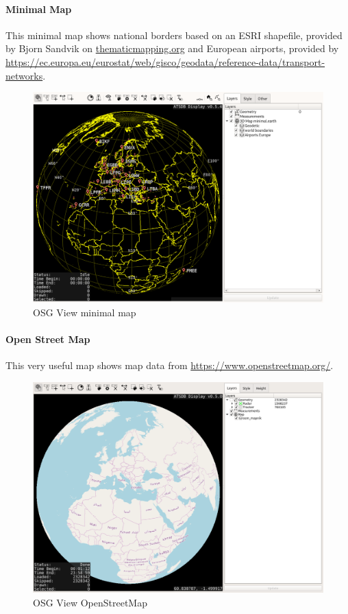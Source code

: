 \newpage
\paragraph{Minimal Map}

This minimal map shows national borders based on an ESRI shapefile, provided by Bjorn Sandvik on \url{thematicmapping.org} and European airports, provided by \url{https://ec.europa.eu/eurostat/web/gisco/geodata/reference-data/transport-networks}.

\begin{figure}[H]
    \hspace*{-2.5cm}
    \includegraphics[width=19cm,frame]{../screenshots/osgview_minimal.png}
  \caption{OSG View minimal map}
\end{figure}

\newpage
\paragraph{Open Street Map}

This very useful map shows map data from \url{https://www.openstreetmap.org/}.

\begin{figure}[H]
    \hspace*{-2.5cm}
    \includegraphics[width=19cm,frame]{../screenshots/osgview_osm.png}
  \caption{OSG View OpenStreetMap}
\end{figure}

